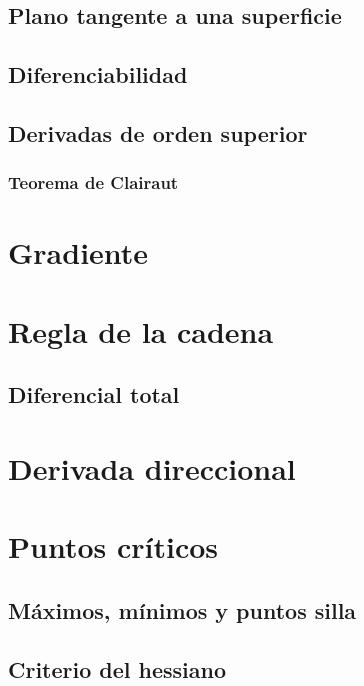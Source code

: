 \documentclass[12pt, fleqn]{report}                             %
\begin{document}
            \subsection{Plano tangente a una superficie}
            
            \subsection{Diferenciabilidad}
            
            \subsection{Derivadas de orden superior}
            
                \subsubsection{Teorema de Clairaut}
                
        \section{Gradiente}
                
        \section{Regla de la cadena}
        
            \subsection{Diferencial total}
            
        \section{Derivada direccional}
        
        \section{Puntos críticos}
        
            \subsection{Máximos, mínimos y puntos silla}
            
            \subsection{Criterio del hessiano}
            
\end{document}

